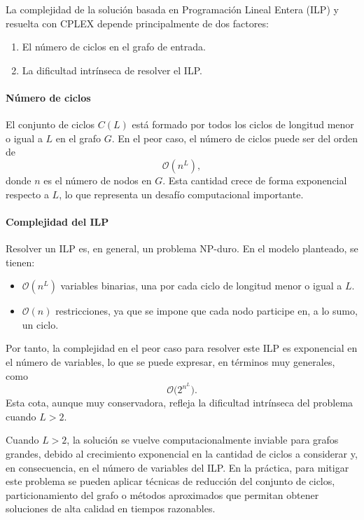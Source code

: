 \documentclass[twocolumn, fontsize=10pt]{article}
\theoremstyle{definition} %
\begin{document}
La complejidad de la solución basada en Programación Lineal Entera (ILP) y resuelta con CPLEX depende principalmente de dos factores:
\begin{enumerate}
    \item El número de ciclos en el grafo de entrada.
    \item La dificultad intrínseca de resolver el ILP.
\end{enumerate}

\paragraph{Número de ciclos} 
El conjunto de ciclos \( C(L) \) está formado por todos los ciclos de longitud menor o igual a \( L \) en el grafo \( G \). En el peor caso, el número de ciclos puede ser del orden de 
\[
\mathcal{O}(n^L),
\]
donde \( n \) es el número de nodos en \( G \). Esta cantidad crece de forma exponencial respecto a \( L \), lo que representa un desafío computacional importante.

\paragraph{Complejidad del ILP}

Resolver un ILP es, en general, un problema NP-duro. En el modelo planteado, se tienen:
\begin{itemize}
    \item \(\mathcal{O}(n^L)\) variables binarias, una por cada ciclo de longitud menor o igual a \( L \).
    \item \(\mathcal{O}(n)\) restricciones, ya que se impone que cada nodo participe en, a lo sumo, un ciclo.
\end{itemize}
Por tanto, la complejidad en el peor caso para resolver este ILP es exponencial en el número de variables, lo que se puede expresar, en términos muy generales, como 
\[
\mathcal{O}\bigl(2^{n^L}\bigr).
\]
Esta cota, aunque muy conservadora, refleja la dificultad intrínseca del problema cuando \( L > 2 \).


Cuando \( L > 2 \), la solución se vuelve computacionalmente inviable para grafos grandes, debido al crecimiento exponencial en la cantidad de ciclos a considerar y, en consecuencia, en el número de variables del ILP. En la práctica, para mitigar este problema se pueden aplicar técnicas de reducción del conjunto de ciclos, particionamiento del grafo o métodos aproximados que permitan obtener soluciones de alta calidad en tiempos razonables.
\end{document}
